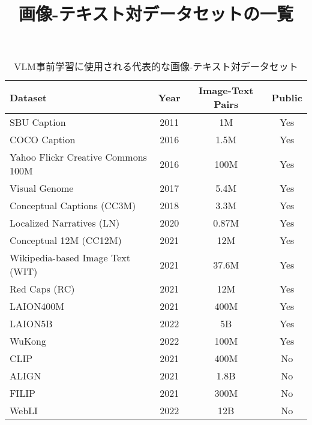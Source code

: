 \documentclass{article}
\title{画像-テキスト対データセットの一覧}
\author{}
\date{}
\begin{document}
\maketitle

\begin{table}[htbp]
    \centering
    \caption{VLM事前学習に使用される代表的な画像-テキスト対データセット}
    \label{tab:vlm_datasets_clean}
    \begin{tabular}{lccc}
        \toprule
        \textbf{Dataset}                   & \textbf{Year} & \textbf{Image-Text Pairs} & \textbf{Public} \\
        \midrule
        SBU Caption                        & 2011          & 1M                        & Yes             \\
        COCO Caption                       & 2016          & 1.5M                      & Yes             \\
        Yahoo Flickr Creative Commons 100M & 2016          & 100M                      & Yes             \\
        Visual Genome                      & 2017          & 5.4M                      & Yes             \\
        Conceptual Captions (CC3M)         & 2018          & 3.3M                      & Yes             \\
        Localized Narratives (LN)          & 2020          & 0.87M                     & Yes             \\
        Conceptual 12M (CC12M)             & 2021          & 12M                       & Yes             \\
        Wikipedia-based Image Text (WIT)   & 2021          & 37.6M                     & Yes             \\
        Red Caps (RC)                      & 2021          & 12M                       & Yes             \\
        LAION400M                          & 2021          & 400M                      & Yes             \\
        LAION5B                            & 2022          & 5B                        & Yes             \\
        WuKong                             & 2022          & 100M                      & Yes             \\
        \midrule
        CLIP                               & 2021          & 400M                      & No              \\
        ALIGN                              & 2021          & 1.8B                      & No              \\
        FILIP                              & 2021          & 300M                      & No              \\
        WebLI                              & 2022          & 12B                       & No              \\
        \bottomrule
    \end{tabular}
\end{table}
\end{document}
